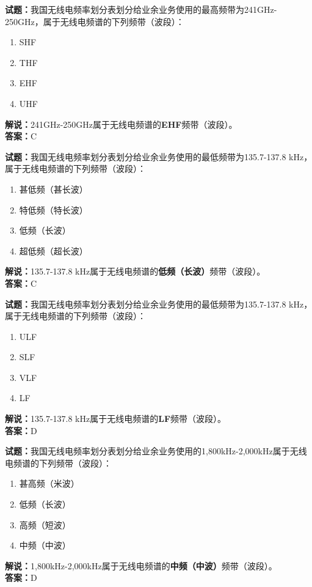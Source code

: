 \documentclass{ctexbook}
\begin{document}
\vspace{\baselineskip}

\noindent\textbf{试题：}我国无线电频率划分表划分给业余业务使用的最高频带为241\unit{\GHz}-250\unit{\GHz}，属于无线电频谱的下列频带（波段）：
\begin{enumerate}[leftmargin=3em]
  \item SHF
  \item THF
  \item EHF
  \item UHF
\end{enumerate}
\noindent\textbf{解说：}241\unit{\GHz}-250\unit{\GHz}属于无线电频谱的\textbf{EHF}频带（波段）。\\\noindent\textbf{答案：}C

\vspace{\baselineskip}

\noindent\textbf{试题：}我国无线电频率划分表划分给业余业务使用的最低频带为135.7-137.8 \unit{\kHz}，属于无线电频谱的下列频带（波段）：
\begin{enumerate}[leftmargin=3em]
  \item 甚低频（甚长波）
  \item 特低频（特长波）
  \item 低频（长波）
  \item 超低频（超长波）
\end{enumerate}
\noindent\textbf{解说：}135.7-137.8 \unit{\kHz}属于无线电频谱的\textbf{低频（长波）}频带（波段）。\\\noindent\textbf{答案：}C

\vspace{\baselineskip}

\noindent\textbf{试题：}我国无线电频率划分表划分给业余业务使用的最低频带为135.7-137.8 \unit{\kHz}，属于无线电频谱的下列频带（波段）：
\begin{enumerate}[leftmargin=3em]
  \item ULF
  \item SLF
  \item VLF
  \item LF
\end{enumerate}
\noindent\textbf{解说：}135.7-137.8 \unit{\kHz}属于无线电频谱的\textbf{LF}频带（波段）。\\\noindent\textbf{答案：}D

\vspace{\baselineskip}

\noindent\textbf{试题：}我国无线电频率划分表划分给业余业务使用的1,800\unit{\kHz}-2,000\unit{\kHz}属于无线电频谱的下列频带（波段）：
\begin{enumerate}[leftmargin=3em]
  \item 甚高频（米波）
  \item 低频（长波）
  \item 高频（短波）
  \item 中频（中波）
\end{enumerate}
\noindent\textbf{解说：}1,800\unit{\kHz}-2,000\unit{\kHz}属于无线电频谱的\textbf{中频（中波）}频带（波段）。\\\noindent\textbf{答案：}D
\end{document}
